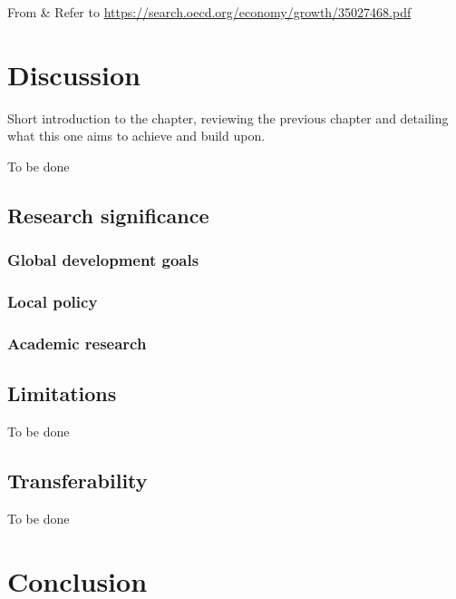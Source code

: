 \documentclass[
  12pt,
  oneside]{book}
\begin{document}
From \& Refer to \url{https://search.oecd.org/economy/growth/35027468.pdf}

\hypertarget{discussion}{%
\chapter{Discussion}\label{discussion}}

Short introduction to the chapter, reviewing the previous chapter and detailing what this one aims to achieve and build upon.

To be done

\hypertarget{research-significance}{%
\section{Research significance}\label{research-significance}}

\hypertarget{global-development-goals}{%
\subsection{Global development goals}\label{global-development-goals}}

\hypertarget{local-policy}{%
\subsection{Local policy}\label{local-policy}}

\hypertarget{academic-research}{%
\subsection{Academic research}\label{academic-research}}

\hypertarget{limitations-1}{%
\section{Limitations}\label{limitations-1}}

To be done

\hypertarget{transferability}{%
\section{Transferability}\label{transferability}}

To be done

\hypertarget{conclusion}{%
\chapter{Conclusion}\label{conclusion}}
\end{document}
